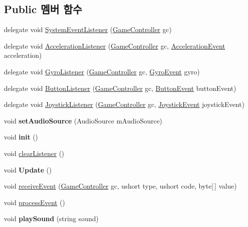 \subsection*{Public 멤버 함수}
\begin{DoxyCompactItemize}
\item 
delegate void \hyperlink{class_event_manager_a65e017fcb7c22959f09becc40ad3bc2d}{System\+Event\+Listener} (\hyperlink{class_game_controller}{Game\+Controller} gc)
\item 
delegate void \hyperlink{class_event_manager_ac459bcb4ba4f140243e271628f8d366c}{Acceleration\+Listener} (\hyperlink{class_game_controller}{Game\+Controller} gc, \hyperlink{class_event_manager_1_1_acceleration_event}{Acceleration\+Event} acceleration)
\item 
delegate void \hyperlink{class_event_manager_a4ed9f5be26f2015a5cc107257f02eff8}{Gyro\+Listener} (\hyperlink{class_game_controller}{Game\+Controller} gc, \hyperlink{class_event_manager_1_1_gyro_event}{Gyro\+Event} gyro)
\item 
delegate void \hyperlink{class_event_manager_ae17715b9a94a50d9a8e1f29580af7c16}{Button\+Listener} (\hyperlink{class_game_controller}{Game\+Controller} gc, \hyperlink{class_event_manager_1_1_button_event}{Button\+Event} button\+Event)
\item 
delegate void \hyperlink{class_event_manager_ad470a4c2e411d814dd480043332f2a70}{Joystick\+Listener} (\hyperlink{class_game_controller}{Game\+Controller} gc, \hyperlink{class_event_manager_1_1_joystick_event}{Joystick\+Event} joystick\+Event)
\item 
\hypertarget{class_event_manager_ac6cc5e4abf6c77869e47e10c777435b0}{}void {\bfseries set\+Audio\+Source} (Audio\+Source m\+Audio\+Source)\label{class_event_manager_ac6cc5e4abf6c77869e47e10c777435b0}

\item 
\hypertarget{class_event_manager_a87a500cb834a14e7e42a4c93cd95c49c}{}void {\bfseries init} ()\label{class_event_manager_a87a500cb834a14e7e42a4c93cd95c49c}

\item 
void \hyperlink{class_event_manager_a1a5bf8b2520c7ce2a1c6b8c54f1974e4}{clear\+Listener} ()
\item 
\hypertarget{class_event_manager_a78838eb337e993284fa0e392db468919}{}void {\bfseries Update} ()\label{class_event_manager_a78838eb337e993284fa0e392db468919}

\item 
void \hyperlink{class_event_manager_ae034ed89247a369411c89f135c836bd9}{receive\+Event} (\hyperlink{class_game_controller}{Game\+Controller} gc, ushort type, ushort code, byte\mbox{[}$\,$\mbox{]} value)
\item 
void \hyperlink{class_event_manager_a84d2c420c890acdc95571366a8b55c74}{process\+Event} ()
\item 
\hypertarget{class_event_manager_a72f2d57c83c611bf39e5dce2a936c4f2}{}void {\bfseries play\+Sound} (string sound)\label{class_event_manager_a72f2d57c83c611bf39e5dce2a936c4f2}

\end{DoxyCompactItemize}
